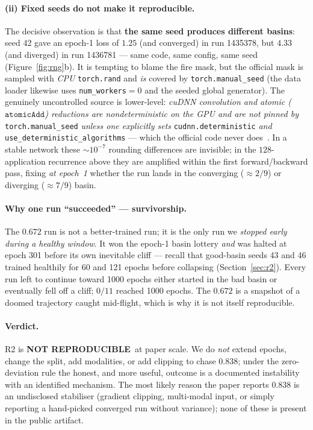 \documentclass[10pt,twocolumn]{article}
\newcommand{\unrepro}{\textcolor{failred}{\textbf{NOT REPRODUCIBLE}}}
\begin{document}
\paragraph{(ii) Fixed seeds do not make it reproducible.} The decisive
observation is that \textbf{the same seed produces different basins}: seed
42 gave an epoch-1 loss of $1.25$ (and converged) in run 1435378, but $4.33$
(and diverged) in run 1436781 --- same code, same config, same seed
(Figure~\ref{fig:rng}b). It is tempting to blame the fire mask, but the
official mask is sampled with \emph{CPU} \texttt{torch.rand} and \emph{is}
covered by \texttt{torch.manual\_seed} (the data loader likewise uses
\texttt{num\_workers}$=0$ and the seeded global generator). The genuinely
uncontrolled source is lower-level: \emph{cuDNN convolution and atomic
($\texttt{atomicAdd}$) reductions are nondeterministic on the GPU and are
not pinned by} \texttt{torch.manual\_seed} \emph{unless one explicitly sets}
\texttt{cudnn.deterministic} \emph{and} \texttt{use\_deterministic\_algorithms}
--- which the official code never does~\cite{pytorch_repro}. In a stable
network these $\sim\!10^{-7}$ rounding differences are invisible; in the
$128$-application recurrence above they are amplified within the first
forward/backward pass, fixing \emph{at epoch~1} whether the run lands in the
converging ($\approx 2/9$) or diverging ($\approx 7/9$) basin.

\paragraph{Why one run ``succeeded'' --- survivorship.} The $0.672$ run is
not a better-trained run; it is the only run we \emph{stopped early during a
healthy window}. It won the epoch-1 basin lottery \emph{and} was halted at
epoch 301 before its own inevitable cliff --- recall that good-basin seeds
43 and 46 trained healthily for 60 and 121 epochs before collapsing
(Section~\ref{sec:r2}). Every run left to continue toward 1000 epochs either
started in the bad basin or eventually fell off a cliff; $0/11$ reached 1000
epochs. The $0.672$ is a snapshot of a doomed trajectory caught mid-flight,
which is why it is not itself reproducible.

\paragraph{Verdict.} R2 is \unrepro\ at paper scale. We do \emph{not}
extend epochs, change the split, add modalities, or add clipping to chase
$0.838$; under the zero-deviation rule the honest, and more useful, outcome
is a documented instability with an identified mechanism. The most likely
reason the paper reports $0.838$ is an undisclosed stabiliser (gradient
clipping, multi-modal input, or simply reporting a hand-picked converged
run without variance); none of these is present in the public artifact.
\end{document}
